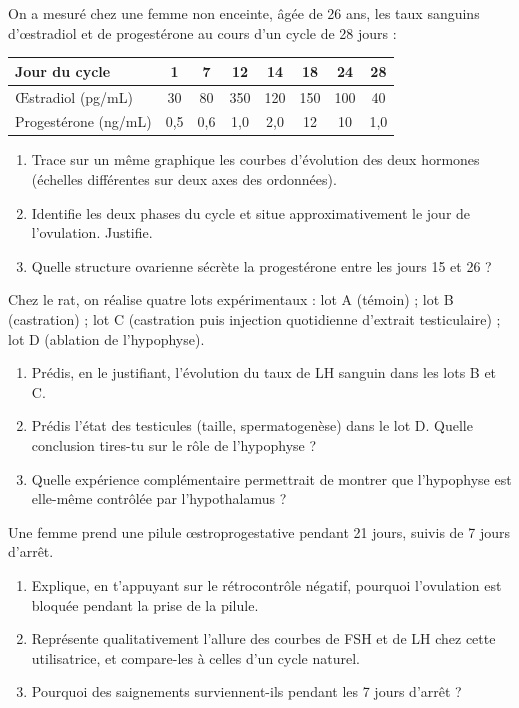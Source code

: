 \documentclass[11pt]{article}
\begin{document}
\begin{exercice}
On a mesuré chez une femme non enceinte, âgée de 26 ans, les taux sanguins d'œstradiol et de progestérone au cours d'un cycle de 28 jours :
\begin{center}
\begin{tabular}{|l|c|c|c|c|c|c|c|}
\hline
\rowcolor{popblueL} Jour du cycle & 1 & 7 & 12 & 14 & 18 & 24 & 28 \\
\hline
Œstradiol (pg/mL) & 30 & 80 & 350 & 120 & 150 & 100 & 40 \\
\hline
Progestérone (ng/mL) & 0,5 & 0,6 & 1,0 & 2,0 & 12 & 10 & 1,0 \\
\hline
\end{tabular}
\end{center}
\begin{enumerate}
\item Trace sur un même graphique les courbes d'évolution des deux hormones (échelles différentes sur deux axes des ordonnées).
\item Identifie les deux phases du cycle et situe approximativement le jour de l'ovulation. Justifie.
\item Quelle structure ovarienne sécrète la progestérone entre les jours 15 et 26 ?
\end{enumerate}
\end{exercice}

\begin{exercice}
Chez le rat, on réalise quatre lots expérimentaux : lot A (témoin) ; lot B (castration) ; lot C (castration puis injection quotidienne d'extrait testiculaire) ; lot D (ablation de l'hypophyse).
\begin{enumerate}
\item Prédis, en le justifiant, l'évolution du taux de LH sanguin dans les lots B et C.
\item Prédis l'état des testicules (taille, spermatogenèse) dans le lot D. Quelle conclusion tires-tu sur le rôle de l'hypophyse ?
\item Quelle expérience complémentaire permettrait de montrer que l'hypophyse est elle-même contrôlée par l'hypothalamus ?
\end{enumerate}
\end{exercice}

\begin{exercice}
Une femme prend une pilule œstroprogestative pendant 21 jours, suivis de 7 jours d'arrêt.
\begin{enumerate}
\item Explique, en t'appuyant sur le rétrocontrôle négatif, pourquoi l'ovulation est bloquée pendant la prise de la pilule.
\item Représente qualitativement l'allure des courbes de FSH et de LH chez cette utilisatrice, et compare-les à celles d'un cycle naturel.
\item Pourquoi des saignements surviennent-ils pendant les 7 jours d'arrêt ?
\end{enumerate}
\end{exercice}
\end{document}
